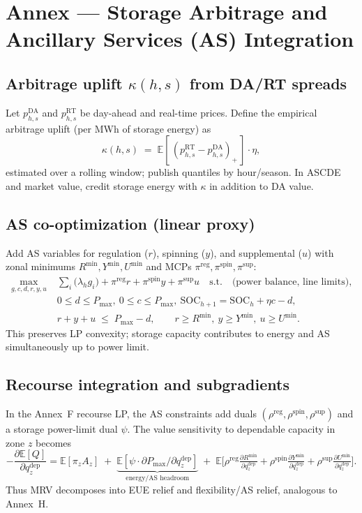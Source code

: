 \documentclass[11pt]{article}
\newcommand{\E}{\mathbb{E}}
\numberwithin{equation}{section}
\theoremstyle{definition}
\theoremstyle{remark}
\begin{document}
\section{Annex  — Storage Arbitrage and Ancillary Services (AS) Integration}
\label{annex:K}

\subsection{Arbitrage uplift \texorpdfstring{$\kappa(h,s)$}{kappa(h,s)} from DA/RT spreads}
Let $p^{\mathrm{DA}}_{h,s}$ and $p^{\mathrm{RT}}_{h,s}$ be day-ahead and real-time prices. Define the empirical arbitrage uplift (per MWh of storage energy) as
\[
\kappa(h,s) \;=\; \E\!\left[\,(p^{\mathrm{RT}}_{h,s}-p^{\mathrm{DA}}_{h,s})_{+}\,\right]\cdot \eta,
\]
estimated over a rolling window; publish quantiles by hour/season. In ASCDE and market value, credit storage energy with $\kappa$ in addition to DA value.

\subsection{ AS co-optimization (linear proxy)}
Add AS variables for regulation ($r$), spinning ($y$), and supplemental ($u$) with zonal minimums $R^{\min},Y^{\min},U^{\min}$ and MCPs $\pi^{\mathrm{reg}},\pi^{\mathrm{spin}},\pi^{\mathrm{sup}}$:
\begin{align*}
\max_{g,c,d,r,y,u}\;& \sum_{i} \big(\lambda_h g_i\big) + \pi^{\mathrm{reg}} r + \pi^{\mathrm{spin}} y + \pi^{\mathrm{sup}} u
\quad \text{s.t.}\quad 
\text{(power balance, line limits),}\\
& 0\le d\le P_{\max},\ 0\le c\le P_{\max},\ \mathrm{SOC}_{h+1}=\mathrm{SOC}_h+\eta c-d, \\
& r+y+u \;\le\; P_{\max}-d,\qquad r\ge R^{\min},\ y\ge Y^{\min},\ u\ge U^{\min}.
\end{align*}
This preserves LP convexity; storage capacity contributes to energy and AS simultaneously up to power limit.

\subsection{ Recourse integration and subgradients}
In the Annex~F recourse LP, the AS constraints add duals $(\rho^{\mathrm{reg}},\rho^{\mathrm{spin}},\rho^{\mathrm{sup}})$ and a storage power-limit dual $\psi$. The value sensitivity to dependable capacity in zone $z$ becomes
\[
-\frac{\partial \E[Q]}{\partial q^{\mathrm{dep}}_{z}} 
= \E[\pi_{z}A_{z}] \;+\; \underbrace{\E[\psi\cdot\partial P_{\max}/\partial q^{\mathrm{dep}}_{z}]}_{\text{energy/AS headroom}}
\;+\; \E\!\big[\rho^{\mathrm{reg}} \tfrac{\partial R^{\min}}{\partial q^{\mathrm{dep}}_{z}} + \rho^{\mathrm{spin}} \tfrac{\partial Y^{\min}}{\partial q^{\mathrm{dep}}_{z}} + \rho^{\mathrm{sup}} \tfrac{\partial U^{\min}}{\partial q^{\mathrm{dep}}_{z}}\big].
\]
Thus MRV decomposes into EUE relief and flexibility/AS relief, analogous to Annex~H.
\end{document}
